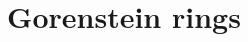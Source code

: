 \documentclass{ximera}
\title{Gorenstein rings}
\begin{document}
\begin{abstract}

\end{abstract}
\maketitle

\end{document}
